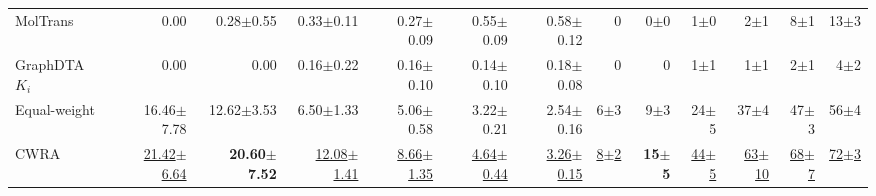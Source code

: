 \begin{table}[htbp!]
\begin{tabular}{lrrrrrr|rrrrrr}
MolTrans & 0.00 & 0.28$\pm$0.55 & 0.33$\pm$0.11 & 0.27$\pm$0.09 & 0.55$\pm$0.09 & 0.58$\pm$0.12 & 0 & 0$\pm$0 & 1$\pm$0 & 2$\pm$1 & 8$\pm$1 & 13$\pm$3 \\
GraphDTA $K_{i}$ & 0.00 & 0.00 & 0.16$\pm$0.22 & 0.16$\pm$0.10 & 0.14$\pm$0.10 & 0.18$\pm$0.08 & 0 & 0 & 1$\pm$1 & 1$\pm$1 & 2$\pm$1 & 4$\pm$2 \\
\midrule
Equal-weight & 16.46$\pm$7.78 & 12.62$\pm$3.53 & 6.50$\pm$1.33 & 5.06$\pm$0.58 & 3.22$\pm$0.21 & 2.54$\pm$0.16 & 6$\pm$3 & 9$\pm$3 & 24$\pm$5 & 37$\pm$4 & 47$\pm$3 & 56$\pm$4 \\
CWRA & \underline{21.42$\pm$6.64} & \textbf{20.60$\pm$7.52} & \underline{12.08$\pm$1.41} & \underline{8.66$\pm$1.35} & \underline{4.64$\pm$0.44} & \underline{3.26$\pm$0.15} & \underline{8$\pm$2} & \textbf{15$\pm$5} & \underline{44$\pm$5} & \underline{63$\pm$10} & \underline{68$\pm$7} & \underline{72$\pm$3} \\
\bottomrule
\end{tabular}
\end{table}
